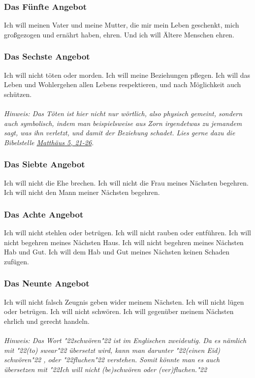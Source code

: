 \documentclass[12pt,a5paper]{article}
\newcommand{\q}[1]{\char"22{#1}\char"22 }
\begin{document}
	\subsubsection{Das F\"unfte Angebot}
		Ich will meinen Vater und meine Mutter,
		die mir mein Leben geschenkt,
		mich gro{\ss}gezogen und ern\"ahrt haben,
		ehren.
		Und ich will \"Altere Menschen ehren.
			
	\subsubsection{Das Sechste Angebot} \label{DasSechsteAngebot}
		Ich will nicht t\"oten oder morden.
		Ich will meine Beziehungen pflegen.
		Ich will das Leben und Wohlergehen allen Lebens respektieren,
		und nach M\"oglichkeit auch sch\"utzen.
		\\
		\\
		\textit{Hinweis:
		Das T\"oten ist hier nicht nur w\"ortlich,
		also physisch gemeint,
		sondern auch symbolisch,
		indem man beispielsweise aus Zorn irgendetwas zu jemandem sagt,
		was ihn verletzt,
		und damit der Beziehung schadet.
		Lies gerne dazu die Bibelstelle \href{https://www.die-bibel.de/bibeln/online-bibeln/lesen/LU17/MAT.5/Matthäus-5}{Matthäus 5, 21-26}.}
		
	\subsubsection{Das Siebte Angebot}
		Ich will nicht die Ehe brechen.
		Ich will nicht die Frau meines N\"achsten begehren.
		Ich will nicht den Mann meiner N\"achsten begehren.
		
	\subsubsection{Das Achte Angebot}
		Ich will nicht stehlen oder betr\"ugen.
		Ich will nicht rauben oder entf\"uhren.
		Ich will nicht begehren meines N\"achsten Haus.
		Ich will nicht begehren meines N\"achsten Hab und Gut.
		Ich will dem Hab und Gut meines N\"achsten keinen Schaden zuf\"ugen.
		
	\subsubsection{Das Neunte Angebot} \label{DasNeunteAngebot}
		Ich will nicht falsch Zeugnis geben wider meinem N\"achsten.
		Ich will nicht l\"ugen oder betr\"ugen.
		Ich will nicht schw\"oren.
		Ich will gegen\"uber meinem N\"achsten ehrlich und gerecht handeln.
		\\
		\\
		\textit{Hinweis:
		Das Wort \q{schw\"oren} ist im Englischen zweideutig.
		Da es n\"amlich mit \q{(to) swear} \"ubersetzt wird,
		kann man darunter \q{(einen Eid) schw\"oren},
		oder \q{fluchen} verstehen.
		Somit k\"onnte man es auch \"ubersetzen mit
		\q{Ich will nicht (be)schw\"oren oder (ver)fluchen.}}
		
\end{document}
